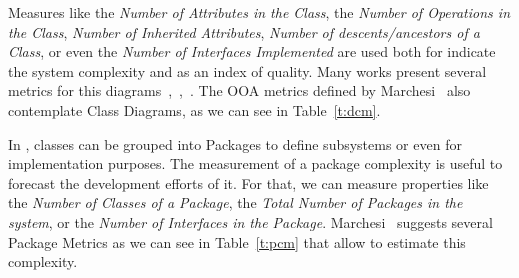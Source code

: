 Measures like the \emph{Number of Attributes in the Class}, the \emph{Number of Operations in the Class}, \emph{Number of Inherited Attributes}, \emph{Number of descents/ancestors of a Class}, or even the \emph{Number of Interfaces Implemented} are used both for indicate the system complexity and as an index of quality.
Many works present several metrics for this diagrams~\cite{DBLP:journals/Lobjet/GeneroPC00},~\cite{Eichelberger_onclass},~\cite{Yi04acomparison}.
The OOA metrics defined by Marchesi~\cite{Marchesi:1998:OMU:522081.795010} also contemplate Class Diagrams, as we can see in Table~\ref{t:dcm}.


In \uml, classes can be grouped into Packages to define subsystems or even for implementation purposes.
The measurement of a package complexity is useful to forecast the development efforts of it.
For that, we can measure properties like the \emph{Number of Classes of a Package}, the \emph{Total Number of Packages in the system}, or the \emph{Number of Interfaces in the Package}.
Marchesi~\cite{Marchesi:1998:OMU:522081.795010} suggests several Package Metrics as we can see in Table~\ref{t:pcm} that allow to estimate this complexity.

